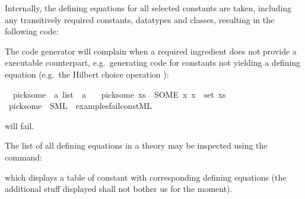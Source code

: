 \begin{isabellebody}
\begin{isamarkuptext}
  Internally, the defining equations for all selected
  constants are taken, including any transitively required
  constants, datatypes and classes, resulting in the following
  code:


  The code generator will complain when a required
  ingredient does not provide a executable counterpart,
  e.g.~generating code
  for constants not yielding
  a defining equation (e.g.~the Hilbert choice
  operation ):%
\end{isamarkuptext}%
\isamarkuptrue%
%
\isadelimML
%
\endisadelimML
%
\isatagML
%
\endisatagML
{\isafoldML}%
%
\isadelimML
%
\endisadelimML
{}\isamarkupfalse%
\isanewline
\ \ pick{\isacharunderscore}some\ {\isacharcolon}{\isacharcolon}\ {\isachardoublequoteopen}{\isacharprime}a\ list\ {\isasymRightarrow}\ {\isacharprime}a{\isachardoublequoteclose}\ \isanewline
\ \ {\isachardoublequoteopen}pick{\isacharunderscore}some\ xs\ {\isacharequal}\ {\isacharparenleft}SOME\ x{\isachardot}\ x\ {\isasymin}\ set\ xs{\isacharparenright}{\isachardoublequoteclose}%
\isadelimML
%
\endisadelimML
%
\isatagML
%
\endisatagML
{\isafoldML}%
%
\isadelimML
%
\endisadelimML
\isanewline
{}\isamarkupfalse%
\ pick{\isacharunderscore}some\ \ SML\ \ {\isachardoublequoteopen}examples{\isacharslash}fail{\isacharunderscore}const{\isachardot}ML{\isachardoublequoteclose}%
\begin{isamarkuptext}%
\noindent will fail.%
\end{isamarkuptext}%
\isamarkuptrue%
%
\isamarkuptrue%
%
\begin{isamarkuptext}%
The list of all defining equations in a theory may be inspected
  using the \isa{{\isasymPRINTCODESETUP}} command:%
\end{isamarkuptext}%
\isamarkuptrue%
\isamarkupfalse%
%
\begin{isamarkuptext}%
\noindent which displays a table of constant with corresponding
  defining equations (the additional stuff displayed
  shall not bother us for the moment).


\end{isamarkuptext}
\end{isabellebody}
